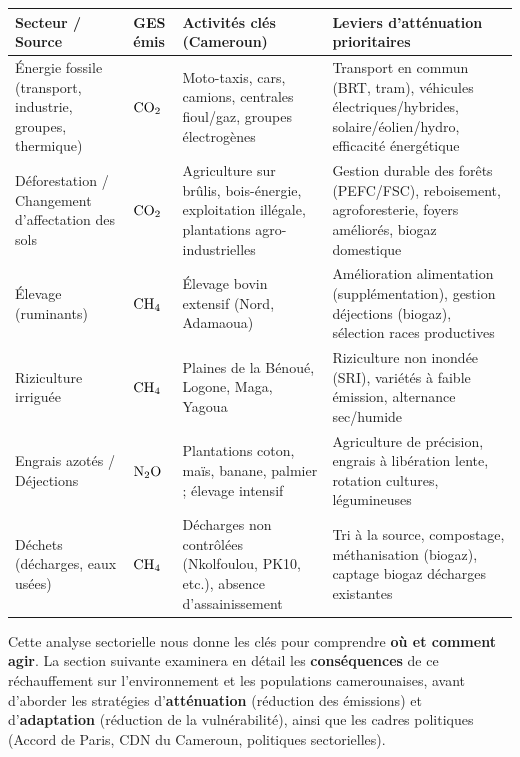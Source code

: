 \documentclass[11pt]{article}
\begin{document}
\begin{aretenir}
\begin{center}
\begin{tabularx}{\linewidth}{|l|X|X|X|}
\hline
\rowcolor{popblueL}
\textbf{Secteur / Source} & \textbf{GES émis} & \textbf{Activités clés (Cameroun)} & \textbf{Leviers d'atténuation prioritaires} \\
\hline
Énergie fossile (transport, industrie, groupes, thermique) & $\ce{CO2}$ & Moto-taxis, cars, camions, centrales fioul/gaz, groupes électrogènes & Transport en commun (BRT, tram), véhicules électriques/hybrides, solaire/éolien/hydro, efficacité énergétique \\
\hline
Déforestation / Changement d'affectation des sols & $\ce{CO2}$ & Agriculture sur brûlis, bois-énergie, exploitation illégale, plantations agro-industrielles & Gestion durable des forêts (PEFC/FSC), reboisement, agroforesterie, foyers améliorés, biogaz domestique \\
\hline
Élevage (ruminants) & $\ce{CH4}$ & Élevage bovin extensif (Nord, Adamaoua) & Amélioration alimentation (supplémentation), gestion déjections (biogaz), sélection races productives \\
\hline
Riziculture irriguée & $\ce{CH4}$ & Plaines de la Bénoué, Logone, Maga, Yagoua & Riziculture non inondée (SRI), variétés à faible émission, alternance sec/humide \\
\hline
Engrais azotés / Déjections & $\ce{N2O}$ & Plantations coton, maïs, banane, palmier ; élevage intensif & Agriculture de précision, engrais à libération lente, rotation cultures, légumineuses \\
\hline
Déchets (décharges, eaux usées) & $\ce{CH4}$ & Décharges non contrôlées (Nkolfoulou, PK10, etc.), absence d'assainissement & Tri à la source, compostage, méthanisation (biogaz), captage biogaz décharges existantes \\
\hline
\end{tabularx}
\end{center}
\end{aretenir}

\medskip
\noindent Cette analyse sectorielle nous donne les clés pour comprendre \textbf{où et comment agir}. La section suivante examinera en détail les \textbf{conséquences} de ce réchauffement sur l'environnement et les populations camerounaises, avant d'aborder les stratégies d'\textbf{atténuation} (réduction des émissions) et d'\textbf{adaptation} (réduction de la vulnérabilité), ainsi que les cadres politiques (Accord de Paris, CDN du Cameroun, politiques sectorielles).
\end{document}
